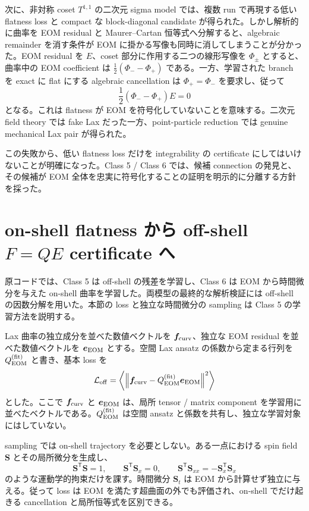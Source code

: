 次に、非対称 coset $T^{1,1}$ の二次元 sigma model では、複数 run で再現する低い flatness loss と compact な block-diagonal candidate が得られた。しかし解析的に曲率を EOM residual と Maurer--Cartan 恒等式へ分解すると、algebraic remainder を消す条件が EOM に掛かる写像も同時に消してしまうことが分かった。EOM residual を $E$、coset 部分に作用する二つの線形写像を $\Phi_\pm$ とすると、曲率中の EOM coefficient は $\frac12(\Phi_- - \Phi_+)$ である。一方、学習された branch を exact に flat にする algebraic cancellation は $\Phi_+=\Phi_-$ を要求し、従って
\begin{equation}
\frac12(\Phi_- - \Phi_+)E=0
\end{equation}
となる。これは flatness が EOM を符号化していないことを意味する。二次元 field theory では fake Lax だった一方、point-particle reduction では genuine mechanical Lax pair が得られた。

この失敗から、低い flatness loss だけを integrability の certificate にしてはいけないことが明確になった。Class 5 / Class 6 では、候補 connection の発見と、その候補が EOM 全体を忠実に符号化することの証明を明示的に分離する方針を採った。

\section{on-shell flatness から off-shell $F=QE$ certificate へ}
\label{sec:ml-offshell}
原コードでは、Class 5 は off-shell の残差を学習し、Class 6 は EOM から時間微分を与えた on-shell 曲率を学習した。両模型の最終的な解析検証には off-shell の因数分解を用いた。本節の loss と独立な時間微分の sampling は Class 5 の学習方法を説明する。

Lax 曲率の独立成分を並べた数値ベクトルを $\boldsymbol f_{\rm curv}$、独立な EOM residual を並べた数値ベクトルを $\boldsymbol e_{\rm EOM}$ とする。空間 Lax ansatz の係数から定まる行列を $Q_{\rm EOM}^{(\mathrm{fit})}$ と書き、基本 loss を
\begin{equation}
\mathcal L_{\rm off}
=
\left\langle
\left\|
\boldsymbol f_{\rm curv}
-Q_{\rm EOM}^{(\mathrm{fit})}\boldsymbol e_{\rm EOM}
\right\|^2
\right\rangle
\label{eq:ml-off-loss}
\end{equation}
とした。ここで $\boldsymbol f_{\rm curv}$ と $\boldsymbol e_{\rm EOM}$ は、局所 tensor / matrix component を学習用に並べたベクトルである。$Q_{\rm EOM}^{(\mathrm{fit})}$ は空間 ansatz と係数を共有し、独立な学習対象にはしていない。

sampling では on-shell trajectory を必要としない。ある一点における spin field $\boldsymbol S$ とその局所微分を生成し、
\begin{equation}
\boldsymbol S^{\mathsf T}\boldsymbol S=1,
\qquad
\boldsymbol S^{\mathsf T}\boldsymbol S_x=0,
\qquad
\boldsymbol S^{\mathsf T}\boldsymbol S_{xx}=-\boldsymbol S_x^{\mathsf T}\boldsymbol S_x
\label{eq:ml-kin-constraints}
\end{equation}
のような運動学的拘束だけを課す。時間微分 $\boldsymbol S_t$ は EOM から計算せず独立に与える。従って loss は EOM を満たす超曲面の外でも評価され、on-shell でだけ起きる cancellation と局所恒等式を区別できる。

